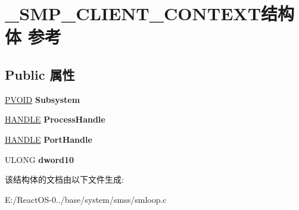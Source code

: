 \hypertarget{struct___s_m_p___c_l_i_e_n_t___c_o_n_t_e_x_t}{}\section{\+\_\+\+S\+M\+P\+\_\+\+C\+L\+I\+E\+N\+T\+\_\+\+C\+O\+N\+T\+E\+X\+T结构体 参考}
\label{struct___s_m_p___c_l_i_e_n_t___c_o_n_t_e_x_t}
\subsection*{Public 属性}
\begin{DoxyCompactItemize}
\item 
\mbox{\label{struct___s_m_p___c_l_i_e_n_t___c_o_n_t_e_x_t_aaf89337d369a1a2cac6add384494c5c0}} 
\hyperlink{interfacevoid}{P\+V\+O\+ID} {\bfseries Subsystem}
\item 
\mbox{\label{struct___s_m_p___c_l_i_e_n_t___c_o_n_t_e_x_t_a0de66dd663c4ea1d76d80266f40470bc}} 
\hyperlink{interfacevoid}{H\+A\+N\+D\+LE} {\bfseries Process\+Handle}
\item 
\mbox{\label{struct___s_m_p___c_l_i_e_n_t___c_o_n_t_e_x_t_a7d2da8f1c458b1b671ce6361c1e447eb}} 
\hyperlink{interfacevoid}{H\+A\+N\+D\+LE} {\bfseries Port\+Handle}
\item 
\mbox{\label{struct___s_m_p___c_l_i_e_n_t___c_o_n_t_e_x_t_a04d2321d9f960c34856443700a56d0e5}} 
U\+L\+O\+NG {\bfseries dword10}
\end{DoxyCompactItemize}


该结构体的文档由以下文件生成\+:\begin{DoxyCompactItemize}
\item 
E\+:/\+React\+O\+S-\/0../base/system/smss/smloop.\+c\end{DoxyCompactItemize}
